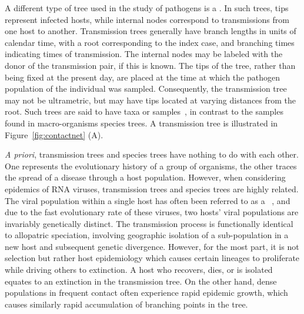 
A different type of tree used in the study of pathogens is a . In such trees, tips represent infected hosts, while internal nodes
correspond to transmissions from one host to another. Transmission trees
generally have branch lengths in units of calendar time, with a root
corresponding to the index case, and branching times indicating times of
transmission. The internal nodes may be labeled with the donor of the
transmission pair, if this is known. The tips of the tree, rather than being
fixed at the present day, are placed at the time at which the pathogen
population of the individual was sampled. Consequently, the transmission tree
may not be ultrametric, but may have tips located at varying distances from the
root. Such trees are said to have  taxa or
samples~\autocite{drummond2003measurably}, in contrast to the
 samples found in macro-organisms species trees. A
transmission tree is illustrated in Figure~\ref{fig:contactnet} (A).

\textit{A priori}, transmission trees and species trees have nothing to do with
each other. One represents the evolutionary history of a group of organisms,
the other traces the spread of a disease through a host population. However,
when considering epidemics of RNA viruses, transmission trees and species trees
are highly related. The viral population within a single host has often been
referred to as a ~\autocite{domingo2012viral}, and due to
the fast evolutionary rate of these viruses, two hosts' viral populations are
invariably genetically distinct. The transmission process is functionally
identical to allopatric speciation, involving geographic isolation of a
sub-population in a new host and subsequent genetic divergence. However, for
the most part, it is not selection but rather host epidemiology which causes
certain lineages to proliferate while driving others to extinction. A host who
recovers, dies, or is isolated equates to an extinction in the transmission
tree. On the other hand, dense populations in frequent contact often experience
rapid epidemic growth, which causes similarly rapid accumulation of branching
points in the tree. 

